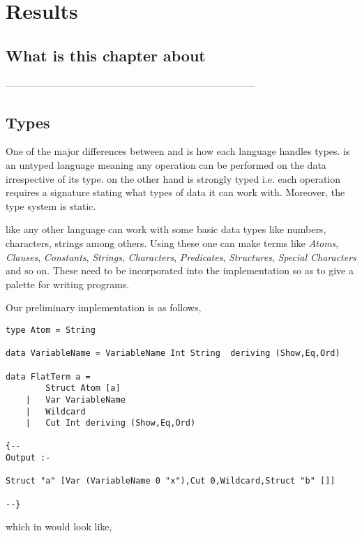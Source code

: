 \documentclass[thesis-solanki.tex]{subfiles}
\begin{document}
\chapter{Results}\label{sect:results}


\section{What is this chapter about}

-----------------------------------------------------------------------------

\section{Types}


One of the major differences between  and  is how each language handles types.  is an 
untyped language meaning any operation can be performed on the data irrespective of its type.  on the other hand is 
strongly typed i.e. each operation requires a signature stating what types of data it can work with. Moreover, the  type 
system is static. 


 like any other language can work with some basic data types like numbers, characters, strings among others. Using these  
one can make terms like \textit{Atoms}, \textit{Clauses}, \textit{Constants}, \textit{Strings}, \textit{Characters}, \textit{Predicates}, 
\textit{Structures}, \textit{Special Characters} and so on. These need to be incorporated into the implementation so as to give a palette
for writing programs. 

Our preliminary implementation is as follows,
\begin{verbatim}
type Atom = String

data VariableName = VariableName Int String  deriving (Show,Eq,Ord)

data FlatTerm a = 
		Struct Atom [a]
	| 	Var VariableName
	|	Wildcard
	|	Cut Int deriving (Show,Eq,Ord)

{--
Output :-

Struct "a" [Var (VariableName 0 "x"),Cut 0,Wildcard,Struct "b" []]

--}
\end{verbatim}
        
which in  would look like,
\end{document}
